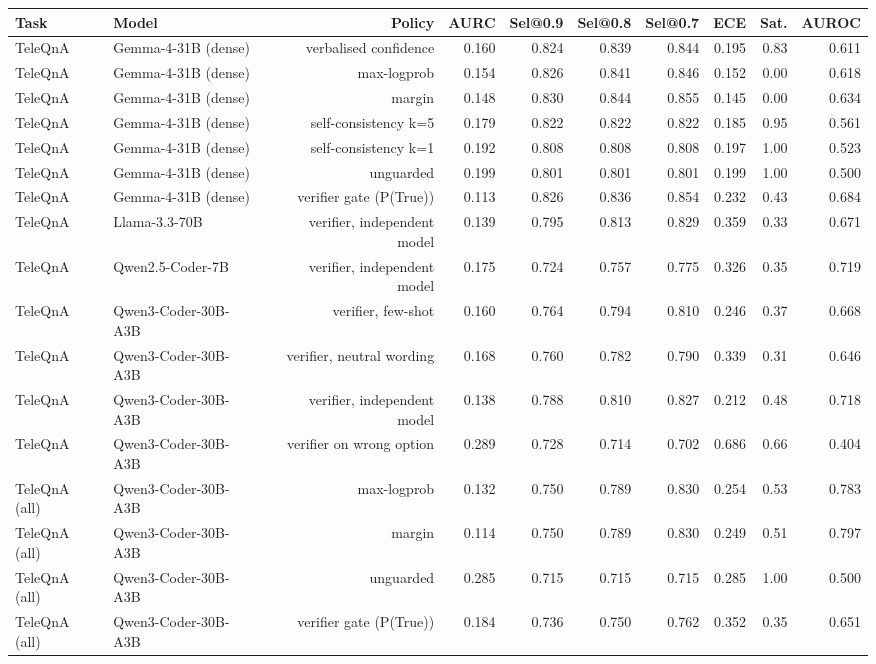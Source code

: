 \begin{tabular}{llrrrrrrrr}
\toprule
Task & Model & Policy & AURC & Sel@0.9 & Sel@0.8 & Sel@0.7 & ECE & Sat. & AUROC \\
\midrule
TeleQnA & Gemma-4-31B (dense) & verbalised confidence & 0.160 & 0.824 & 0.839 & 0.844 & 0.195 & 0.83 & 0.611 \\
TeleQnA & Gemma-4-31B (dense) & max-logprob & 0.154 & 0.826 & 0.841 & 0.846 & 0.152 & 0.00 & 0.618 \\
TeleQnA & Gemma-4-31B (dense) & margin & 0.148 & 0.830 & 0.844 & 0.855 & 0.145 & 0.00 & 0.634 \\
TeleQnA & Gemma-4-31B (dense) & self-consistency k=5 & 0.179 & 0.822 & 0.822 & 0.822 & 0.185 & 0.95 & 0.561 \\
TeleQnA & Gemma-4-31B (dense) & self-consistency k=1 & 0.192 & 0.808 & 0.808 & 0.808 & 0.197 & 1.00 & 0.523 \\
TeleQnA & Gemma-4-31B (dense) & unguarded & 0.199 & 0.801 & 0.801 & 0.801 & 0.199 & 1.00 & 0.500 \\
TeleQnA & Gemma-4-31B (dense) & verifier gate (P(True)) & 0.113 & 0.826 & 0.836 & 0.854 & 0.232 & 0.43 & 0.684 \\
TeleQnA & Llama-3.3-70B & verifier, independent model & 0.139 & 0.795 & 0.813 & 0.829 & 0.359 & 0.33 & 0.671 \\
TeleQnA & Qwen2.5-Coder-7B & verifier, independent model & 0.175 & 0.724 & 0.757 & 0.775 & 0.326 & 0.35 & 0.719 \\
TeleQnA & Qwen3-Coder-30B-A3B & verifier, few-shot & 0.160 & 0.764 & 0.794 & 0.810 & 0.246 & 0.37 & 0.668 \\
TeleQnA & Qwen3-Coder-30B-A3B & verifier, neutral wording & 0.168 & 0.760 & 0.782 & 0.790 & 0.339 & 0.31 & 0.646 \\
TeleQnA & Qwen3-Coder-30B-A3B & verifier, independent model & 0.138 & 0.788 & 0.810 & 0.827 & 0.212 & 0.48 & 0.718 \\
TeleQnA & Qwen3-Coder-30B-A3B & verifier on wrong option & 0.289 & 0.728 & 0.714 & 0.702 & 0.686 & 0.66 & 0.404 \\
TeleQnA (all) & Qwen3-Coder-30B-A3B & max-logprob & 0.132 & 0.750 & 0.789 & 0.830 & 0.254 & 0.53 & 0.783 \\
TeleQnA (all) & Qwen3-Coder-30B-A3B & margin & 0.114 & 0.750 & 0.789 & 0.830 & 0.249 & 0.51 & 0.797 \\
TeleQnA (all) & Qwen3-Coder-30B-A3B & unguarded & 0.285 & 0.715 & 0.715 & 0.715 & 0.285 & 1.00 & 0.500 \\
TeleQnA (all) & Qwen3-Coder-30B-A3B & verifier gate (P(True)) & 0.184 & 0.736 & 0.750 & 0.762 & 0.352 & 0.35 & 0.651 \\
\bottomrule
\end{tabular}
